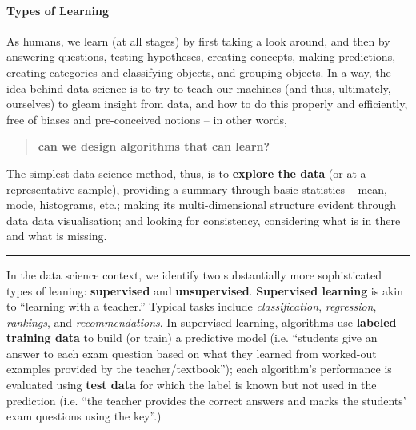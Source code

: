\paragraph{Types of Learning} 
As humans, we learn (at all stages) by first taking a look around, and then by answering questions, testing hypotheses, creating concepts, making predictions, creating categories and classifying objects, and grouping objects. In a way, the idea behind data science is to try to teach our machines (and thus, ultimately, ourselves) to gleam insight from data, and how to do this properly and efficiently, free of biases and pre-conceived notions -- in other words, \begin{quote} \textbf{can we design algorithms that can learn?}\end{quote} The simplest data science method, thus, is to \textbf{explore the data} (or at a representative sample), providing a summary through basic statistics -- mean, mode, histograms, etc.; making its multi-dimensional structure evident through data data visualisation; and looking for consistency, considering what is in there and what is missing.
\begin{center}
    \rule{0.5\textwidth}{.4pt}
\end{center}  In the data science context, we identify two substantially more sophisticated types of leaning:  \textbf{supervised} and  \textbf{unsupervised}. \textbf{Supervised learning} is akin to ``learning with a teacher.'' Typical tasks include \textit{classification}, \textit{regression}, \textit{rankings}, and \textit{recommendations}. In supervised learning, algorithms use \textbf{labeled training data} to build (or train) a predictive model (i.e. ``students give an answer to each exam question based on what they learned from worked-out examples provided by the teacher/textbook''); each algorithm's performance is evaluated using \textbf{test data} for which the label is known but not used in the prediction  (i.e. ``the teacher provides the correct answers and marks the students' exam questions using the key''.)\par
